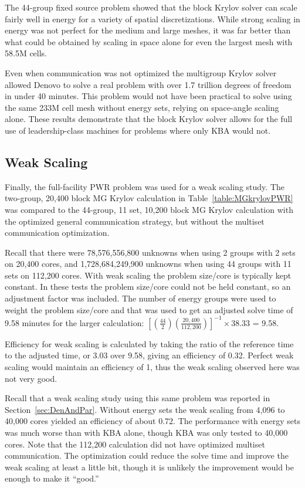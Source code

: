 The 44-group fixed source problem showed that the block Krylov solver can scale fairly well in energy for a variety of spatial discretizations.  While strong scaling in energy was not perfect for the medium and large meshes, it was far better than what could be obtained by scaling in space alone for even the largest mesh with 58.5M cells. 

Even when communication was not optimized the multigroup Krylov solver allowed Denovo to solve a real problem with over 1.7 trillion degrees of freedom in under 40 minutes. This problem would not have been practical to solve using the same 233M cell mesh without energy sets, relying on space-angle scaling alone. These results demonstrate that the block Krylov solver allows for the full use of leadership-class machines for problems where only KBA would not.

\subsection{Weak Scaling}
Finally, the full-facility PWR problem was used for a weak scaling study. The two-group, 20,400 block MG Krylov calculation in Table~\ref{table:MGkrylovPWR} was compared to the 44-group, 11 set, 10,200 block MG Krylov calculation with the optimized general communication strategy, but without the multiset communication optimization. 

Recall that there were 78,576,556,800 unknowns when using 2 groups with 2 sets on 20,400 cores, and 1,728,684,249,900 unknowns when using 44 groups with 11 sets on 112,200 cores. With weak scaling the problem size/core is typically kept constant. In these tests the problem size/core could not be held constant, so an adjustment factor was included. The number of energy groups were used to weight the problem size/core and that was used to get an adjusted solve time of 9.58 minutes for the larger calculation: $[(\frac{44}{2})(\frac{20,400}{112,200})]^{-1}\times38.33$ = 9.58. 

Efficiency for weak scaling is calculated by taking the ratio of the reference time to the adjusted time, or 3.03 over 9.58, giving an efficiency of 0.32. %
Perfect weak scaling would maintain an efficiency of 1, thus the weak scaling observed here was not very good. 

Recall that a weak scaling study using this same problem was reported in Section~\ref{sec:DenAndPar}. Without energy sets the weak scaling from 4,096 to 40,000 cores yielded an efficiency of about 0.72. The performance with energy sets was much worse than with KBA alone, though KBA was only tested to 40,000 cores. Note that the 112,200 calculation did not have optimized multiset communication. The optimization could reduce the solve time and improve the weak scaling at least a little bit, though it is unlikely the improvement would be enough to make it ``good.''
%


